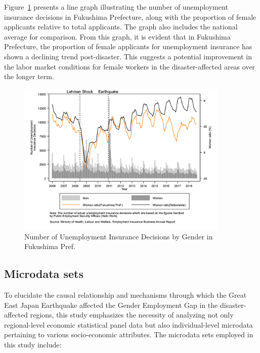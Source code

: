\documentclass[12pt,halfline,a4paper]{ouparticle}
\begin{document}
\newpage

Figure~\ref{fig:employment_insurance_decisions} presents a line graph illustrating the number of unemployment insurance decisions in Fukushima Prefecture, along with the proportion of female applicants relative to total applicants. The graph also includes the national average for comparison. From this graph, it is evident that in Fukushima Prefecture, the proportion of female applicants for unemployment insurance has shown a declining trend post-disaster. This suggests a potential improvement in the labor market conditions for female workers in the disaster-affected areas over the longer term.

\begin{figure}[h!]
    \centering
    \includegraphics[width=0.9\textwidth]{Number of Unemployment Insurance decisions.jpg}  %
    \caption{Number of Unemployment Insurance Decisions by Gender in Fukushima Pref.}
    \label{fig:employment_insurance_decisions}
\end{figure}


\newpage

\subsection{Microdata sets}
\label{sec5.1}

To elucidate the causal relationship and mechanisms through which the Great East Japan Earthquake affected the Gender Employment Gap in the disaster-affected regions, this study emphasizes the necessity of analyzing not only regional-level economic statistical panel data but also individual-level microdata pertaining to various socio-economic attributes. The microdata sets employed in this study include:
\end{document}

